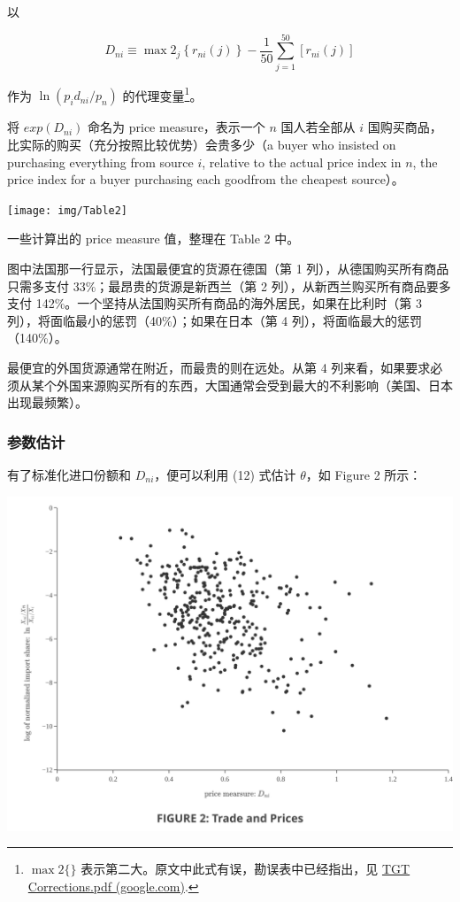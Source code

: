 \documentclass[
]{article}
\begin{document}
以

\[
D_{n i} \equiv \max 2_{j}\left\{r_{n i}(j)\right\}-\frac{1}{50}\sum_{j=1}^{50}\left[r_{n i}(j)\right] \tag{13}
\]

作为 \(\ln ({p_{i} d_{n i}}/{p_{n}})\) 的代理变量\footnote{\(\max 2\{\}\)\hspace{0pt} 表示第二大。原文中此式有误，勘误表中已经指出，见 \href{https://drive.google.com/viewerng/viewer?a=v\&pid=sites\&srcid=eWFsZS5lZHV8a29ydHVtfGd4OjU1YzE1YTIxYTJlNzA3MjE}{TGT
  Corrections.pdf
  (google.com)}.}。

将 \(exp(D_{n i})\) 命名为 price measure，表示一个 \(n\) 国人若全部从 \(i\)
国购买商品，比实际的购买（充分按照比较优势）会贵多少（a buyer who insisted on
purchasing everything from source \(i\), relative to the actual price index in
\(n\), the price index for a buyer purchasing each goodfrom the cheapest
source）。

\begin{center}\texttt{[image: img/Table2]} \end{center}

一些计算出的 price measure 值，整理在 Table 2 中。

图中法国那一行显示，法国最便宜的货源在德国（第 1
列），从德国购买所有商品只需多支付 33\%；最昂贵的货源是新西兰（第 2
列），从新西兰购买所有商品要多支付
142\%。一个坚持从法国购买所有商品的海外居民，如果在比利时（第 3
列），将面临最小的惩罚（40\%）；如果在日本（第 4 列），将面临最大的惩罚（140\%）。

最便宜的外国货源通常在附近，而最贵的则在远处。从第 4
列来看，如果要求必须从某个外国来源购买所有的东西，大国通常会受到最大的不利影响（美国、日本出现最频繁）。

\hypertarget{ux53c2ux6570ux4f30ux8ba1}{%
\subsubsection{参数估计}\label{ux53c2ux6570ux4f30ux8ba1}}

有了标准化进口份额和 \(D_{n i}\)，便可以利用 (12) 式估计 \(\theta\)，如
Figure 2 所示：

\begin{center}\includegraphics[width=0.9\linewidth]{img/Figure2} \end{center}
\end{document}
